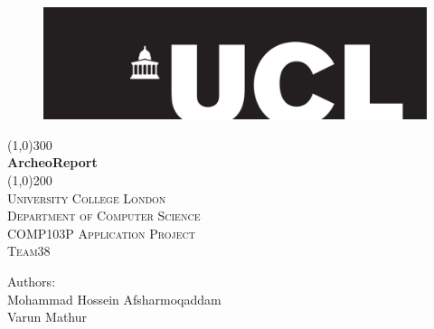 \documentclass[12pt]{article}
\begin{document}
\begin{titlepage}
	\begin{center}
	\begin{figure}[t]
	\hspace*{0.35cm}\includegraphics[width=1.0\textwidth]{uclLogo}\\
	\end{figure}
	\line(1,0){300}\\
	[0.25in]
	\huge{\bfseries ArcheoReport}\\
	[2mm]
	\line(1,0){200}\\
	[1.5cm]
	\textsc{\LARGE University College London}\\
	\textsc{\normalsize Department of Computer Science}\\
	\textsc{\normalsize COMP103P Application Project}\\
	\textsc{\normalsize Team38}\\
	[5cm]
	\end{center}
	\begin{flushright}
	{\large Authors: \\}
	Mohammad Hossein Afsharmoqaddam\\
	Varun Mathur
	\end{flushright}
\end{titlepage}
\tableofcontents

\newpage
\end{document}
